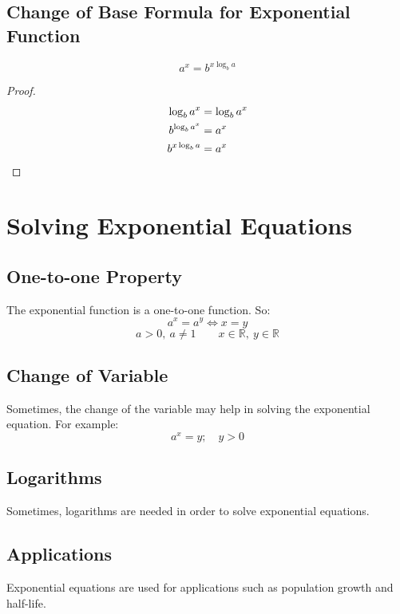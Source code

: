 		\subsection{Change of Base Formula for Exponential Function}
			\[a^x = b^{x\log_b a}\]
			\begin{proof}
				\begin{align*}
					\log_b a^x &= \log_b a^x \\
					b^{\log_b a^x} &= a^x \\
					b^{x\log_b a} &= a^{x} \qedhere
				\end{align*}
			\end{proof}
	\section{Solving Exponential Equations}
		\subsection{One-to-one Property}
			The exponential function is a one-to-one function. So:
			\[a^x=a^y \iff x = y\]
			\[a > 0,\ a \neq 1 \qquad x \in \mathbb{R},\ y \in \mathbb{R}\]
		\subsection{Change of Variable}
			Sometimes, the change of the variable may help in solving the exponential equation. For example:
			\[a^x=y; \quad y > 0\]
		\subsection{Logarithms}
			Sometimes, logarithms are needed in order to solve exponential equations.
		\subsection{Applications}
			Exponential equations are used for applications such as population growth and half-life.

